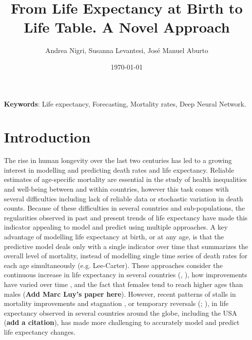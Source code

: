 \documentclass[a4,11pt]{article}
\title{From Life Expectancy at Birth to Life Table. A Novel Approach}
\author{Andrea Nigri, Susanna Levantesi, Jos\'e Manuel Aburto}
\date{\today}
\begin{document}
	\maketitle
	\bigskip
	\begin{flushleft}
		\textbf{Keywords}: Life expectancy, Forecasting, Mortality rates, Deep Neural Network.
	\end{flushleft}
	
\section{Introduction}
The rise in human longevity over the last two centuries has led to a growing interest in modelling and predicting death rates and life expectancy. Reliable estimates of age-specific mortality are essential in the study of health inequalities and well-being between and within countries, however this task comes with several difficulties including lack of reliable data or stochastic variation in death counts. Because of these difficulties in several countries and sub-populations, the regularities observed in past and present trends of life expectancy have made this indicator appealing to model and predict using multiple approaches. A key advantage of modelling life expectancy at birth, or at any age, is that the predictive model deals only with a single indicator over time that summarizes the overall level of mortality, instead of modelling single time series of death rates for each age simultaneously (e.g. Lee-Carter). These approaches consider the continuous increase in life expectancy in several countries (\cite{HM}, \cite{OV2002}), how improvements have varied over time \citet{Vallin}, and the fact that females tend to reach higher ages than males (\textbf{Add Marc Luy's paper here}). However, recent patterns of stalls in mortality improvements and stagnation \cite{Ho}, or temporary reversals (\cite{aburto_16}; \cite{garcia_19}), in life expectancy observed in several countries around the globe, including the USA (\textbf{add a citation}), has made more challenging to accurately model and predict life expectancy changes.
\end{document}
